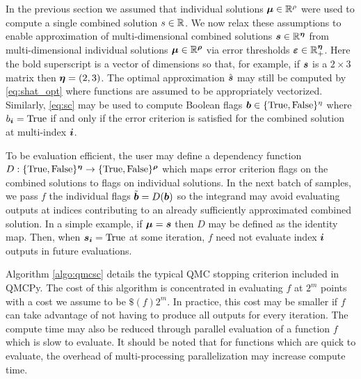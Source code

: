 \documentclass{article}[12pt]
\begin{document}
In the previous section we assumed that individual solutions $\boldsymbol{\mu} \in \mathbb{R}^\rho$ were used to compute a single combined solution $s \in \mathbb{R}$. We now relax these assumptions to enable approximation of multi-dimensional combined solutions $\boldsymbol{s} \in \mathbb{R}^{\boldsymbol{\eta}}$ from multi-dimensional individual solutions $\boldsymbol{\mu} \in \mathbb{R}^{\boldsymbol{\rho}}$ via error thresholds $\boldsymbol{\varepsilon} \in \mathbb{R}_+^{\boldsymbol{\eta}}$. Here the bold superscript is a vector of dimensions so that, for example, if $\boldsymbol{s}$ is a $2 \times 3$ matrix then $\boldsymbol{\eta} = (2,3)$. The optimal approximation $\hat{\boldsymbol{s}}$ may still be computed by \eqref{eq:shat_opt} where functions are assumed to be appropriately vectorized. Similarly, \eqref{eq:sc} may be used to compute Boolean flags $\boldsymbol{b} \in \{\text{True},\text{False}\}^\eta$ where $b_{\boldsymbol{i}}=\text{True}$ if and only if the error criterion is satisfied for the combined solution at multi-index $\boldsymbol{i}$. 

To be evaluation efficient, the user may define a dependency function $D: \{\text{True},\text{False}\}^{\boldsymbol{\eta}} \to \{\text{True},\text{False}\}^{\boldsymbol{\rho}}$ which maps error criterion flags on the combined solutions to flags on individual solutions. In the next batch of samples, we pass $f$ the individual flags $\tilde{\boldsymbol{b}} = D(\boldsymbol{b})$ so the integrand may avoid evaluating outputs at indices contributing to an already sufficiently approximated combined solution. In a simple example, if $\boldsymbol{\mu}=\boldsymbol{s}$ then $D$ may be defined as the identity map. Then, when $\boldsymbol{s}_{\boldsymbol{i}}=\text{True}$ at some iteration, $f$ need not evaluate index ${\boldsymbol{i}}$ outputs in future evaluations. 

Algorithm \ref{algo:qmcsc} details the typical QMC stopping criterion included in QMCPy. The cost of this algorithm is concentrated in evaluating $f$ at $2^m$ points with a cost we assume to be $\$(f)2^m$. In practice, this cost may be smaller if $f$ can take advantage of not having to produce all outputs for every iteration. The compute time may also be reduced through parallel evaluation of a function $f$ which is slow to evaluate. It should be noted that for functions which are quick to evaluate, the overhead of multi-processing parallelization may increase compute time.
\end{document}

